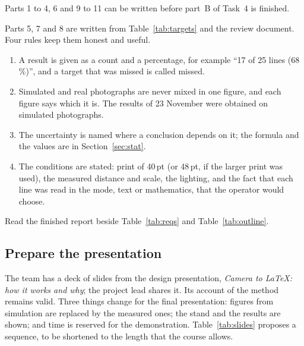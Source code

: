 Parts 1 to 4, 6 and 9 to 11 can be written before part~B of Task~4 is finished.

Parts 5, 7 and 8 are written from Table~\ref{tab:targets} and the review document. Four rules
keep them honest and useful.
\begin{enumerate}
\item A result is given as a count and a percentage, for example ``17 of 25 lines (68\,\%)'',
  and a target that was missed is called missed.
\item Simulated and real photographs are never mixed in one figure, and each figure says which
  it is. The results of 23 November were obtained on simulated photographs.
\item The uncertainty is named where a conclusion depends on it; the formula and the values
  are in Section~\ref{sec:stat}.
\item The conditions are stated: print of 40\,pt (or 48\,pt, if the larger print was used), the
  measured distance and scale, the lighting, and the fact that each line was read in the mode,
  text or mathematics, that the operator would choose.
\end{enumerate}

Read the finished report beside Table~\ref{tab:reqs} and Table~\ref{tab:outline}.

\subsection{Prepare the presentation}

The team has a deck of slides from the design presentation, \emph{Camera to \LaTeX{}: how it
works and why}; the project lead shares it. Its account of the method remains valid. Three
things change for the final presentation: figures from simulation are replaced by the measured
ones; the stand and the results are shown; and time is reserved for the demonstration.
Table~\ref{tab:slides} proposes a sequence, to be shortened to the length that the course
allows.

